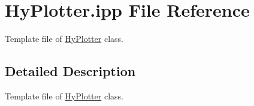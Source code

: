 \hypertarget{HyPlotter_8ipp}{
\section{HyPlotter.ipp File Reference}
\label{HyPlotter_8ipp}
}


Template file of \hyperlink{classHyPlotter}{HyPlotter} class.  




\subsection{Detailed Description}
Template file of \hyperlink{classHyPlotter}{HyPlotter} class. 